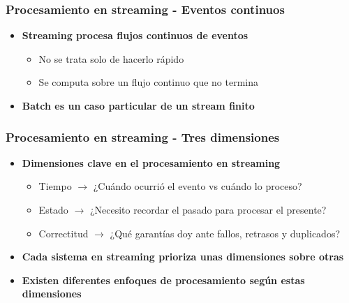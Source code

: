 \documentclass[aspectratio=169]{beamer}
\begin{document}
\begin{frame}
\frametitle{Procesamiento en streaming - Eventos continuos}
\begin{itemize}
  \item \textbf{Streaming procesa flujos continuos de eventos}
  \begin{itemize}
    \item No se trata solo de hacerlo rápido
    \item Se computa sobre un flujo continuo que no termina
  \end{itemize}

  \vspace{1em}

  \item \textbf{Batch es un caso particular de un stream finito}
\end{itemize}
\end{frame}


\begin{frame}
\frametitle{Procesamiento en streaming - Tres dimensiones}
\begin{itemize}
  \item \textbf{Dimensiones clave en el procesamiento en streaming}
  \begin{itemize}
    \item Tiempo $\rightarrow$ ¿Cuándo ocurrió el evento vs cuándo lo proceso?
    \item Estado $\rightarrow$ ¿Necesito recordar el pasado para procesar el presente?
    \item Correctitud $\rightarrow$ ¿Qué garantías doy ante fallos, retrasos y duplicados?
  \end{itemize}

  \vspace{1em}

  \item \textbf{Cada sistema en streaming prioriza unas dimensiones sobre otras}
  
  \vspace{1em}
  
  \item \textbf{Existen diferentes enfoques de procesamiento según estas dimensiones}
\end{itemize}
\end{frame}
\end{document}

